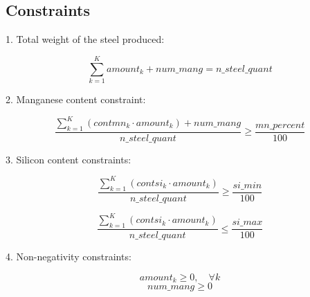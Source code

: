 \documentclass{article}
\begin{document}
\subsection*{Constraints}

1. Total weight of the steel produced:

\[
\sum_{k=1}^{K} amount_k + num\_mang = n\_steel\_quant
\]

2. Manganese content constraint:

\[
\frac{\sum_{k=1}^{K} (contmn_k \cdot amount_k) + num\_mang}{n\_steel\_quant} \geq \frac{mn\_percent}{100}
\]

3. Silicon content constraints:

\[
\frac{\sum_{k=1}^{K} (contsi_k \cdot amount_k)}{n\_steel\_quant} \geq \frac{si\_min}{100}
\]

\[
\frac{\sum_{k=1}^{K} (contsi_k \cdot amount_k)}{n\_steel\_quant} \leq \frac{si\_max}{100}
\]

4. Non-negativity constraints:

\[
amount_k \geq 0, \quad \forall k
\]
\[
num\_mang \geq 0
\]
\end{document}
